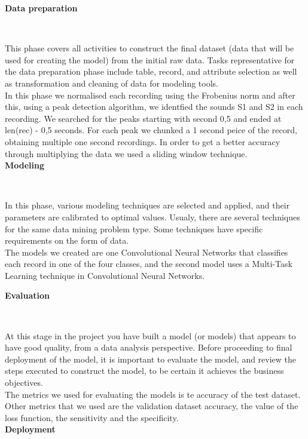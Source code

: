 \documentclass[11pt, a4papper]{report}
\theoremstyle{plain}
\theoremstyle{definition}
\theoremstyle{definition}
\theoremstyle{proposition}
\begin{document}
\textbf{Data preparation}

\

This phase covers all activities to construct the final dataset (data that will be used for creating the model) from the initial raw data. Tasks representative for the data preparation phase include table, record, and attribute selection as well as transformation and cleaning of data for modeling tools.
\\

In this phase we normalised each recording using the Frobenius norm and after this, using a peak detection algorithm, we identfied the sounds S1 and S2 in each recording. We searched for the peaks starting with second 0,5 and ended at len(rec) - 0,5 seconds. For each peak we chunked a 1 second peice of the record, obtaining multiple one second recordings. In order to get a better accuracy through multiplying the data we used a sliding window technique.
\\

\textbf{Modeling}

\

In this phase, various modeling techniques are selected and applied, and their parameters are calibrated to optimal values. Usualy, there are several techniques for the same data mining problem type. Some techniques have specific requirements on the form of data.
\\

The models we created are one Convolutional Neural Networks that classifies each record in one of the four classes, and the second model uses a Multi-Task Learning technique in Convolutional Neural Networks.

\textbf{Evaluation}

\

At this stage in the project you have built a model (or models) that appears to have good quality, from a data analysis perspective. Before proceeding to final deployment of the model, it is important to evaluate the model, and review the steps executed to construct the model, to be certain it achieves the business objectives.
\\

The metrics we used for evaluating the models is te accuracy of the test dataset. Other metrics that we used are the validation dataset accuracy, the value of the loss function, the sensitivity and the specificity.
\\

\textbf{Deployment}
\end{document}
